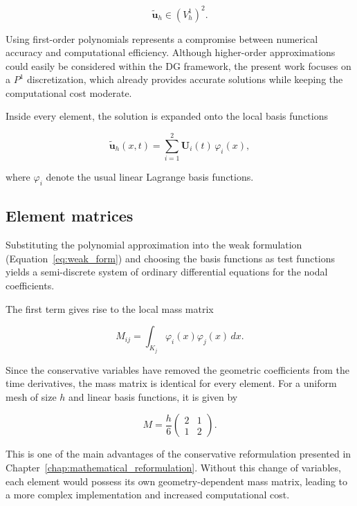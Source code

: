 \documentclass[11pt,a4paper]{report}
\theoremstyle{plain}
\theoremstyle{definition}
\begin{document}
\begin{equation}
\tilde{\mathbf u}_h
\in
(V_h^1)^2.
\end{equation}

Using first-order polynomials represents a compromise between numerical
accuracy and computational efficiency. Although higher-order approximations
could easily be considered within the DG framework, the present work focuses on
a $P^1$ discretization, which already provides accurate solutions while keeping
the computational cost moderate.

Inside every element, the solution is expanded onto the local basis functions

\begin{equation}
\tilde{\mathbf u}_h(x,t)
=
\sum_{i=1}^{2}
\mathbf U_i(t)\,
\varphi_i(x),
\end{equation}

where $\varphi_i$ denote the usual linear Lagrange basis functions.


\subsection{Element matrices}

Substituting the polynomial approximation into the weak formulation
(Equation~\eqref{eq:weak_form}) and choosing the basis functions as test
functions yields a semi-discrete system of ordinary differential equations for
the nodal coefficients.

The first term gives rise to the local mass matrix

\begin{equation}
M_{ij}
=
\int_{K_j}
\varphi_i(x)\varphi_j(x)\,dx.
\end{equation}

Since the conservative variables have removed the geometric coefficients from
the time derivatives, the mass matrix is identical for every element. For a
uniform mesh of size \(h\) and linear basis functions, it is given by

\begin{equation}
M
=
\frac{h}{6}
\begin{pmatrix}
2 & 1\\
1 & 2
\end{pmatrix}.
\end{equation}

This is one of the main advantages of the conservative reformulation presented
in Chapter~\ref{chap:mathematical_reformulation}. Without this change of
variables, each element would possess its own geometry-dependent mass matrix,
leading to a more complex implementation and increased computational cost.
\end{document}
